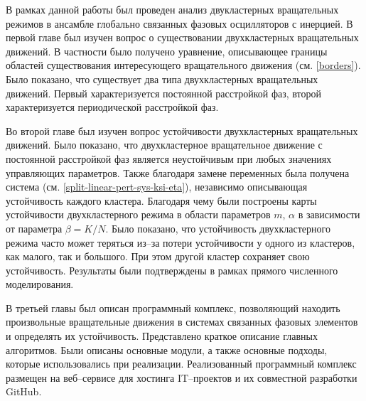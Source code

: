 В рамках данной работы был проведен анализ двукластерных вращательных режимов в ансамбле глобально связанных фазовых осцилляторов с инерцией. 
В первой главе был изучен вопрос о существовании двухкластерных
вращательных движений. В частности было получено уравнение,
описывающее границы областей существования интересующего вращательного 
движения (см. \eqref{borders}). Было показано, что существует два типа
двухкластерных вращательных движений. Первый характеризуется постоянной
расстройкой фаз, второй характеризуется периодической расстройкой фаз.


Во второй главе был изучен вопрос устойчивости двухкластерных
вращательных движений. Было показано, что двухкластерное вращательное
движение с постоянной расстройкой фаз является неустойчивым при любых значениях
управляющих параметров. Также благодаря замене переменных была получена система (см. \eqref{split-linear-pert-sys-ksi-eta}),
независимо описывающая устойчивость каждого кластера. Благодаря чему были построены карты
устойчивости двухкластерного режима в области параметров $m$, $\alpha$ в зависимости от
параметра $\beta = K/N$. Было показано, что устойчивость
двухкластерного режима часто может теряться из--за потери устойчивости
у одного из кластеров, как малого, так и большого. При этом другой кластер
сохраняет свою устойчивость. Результаты были подтверждены в рамках прямого
численного моделирования.

В третьей главы был описан программный комплекс, позволяющий находить произвольные
вращательные движения в системах связанных фазовых элементов и определять их устойчивость. Представлено краткое описание главных алгоритмов.
Были описаны основные модули, а также
основные подходы, которые использовались при реализации.
Реализованный программный комплекс размещен на веб--сервисе для хостинга IT--проектов и их совместной разработки GitHub.
